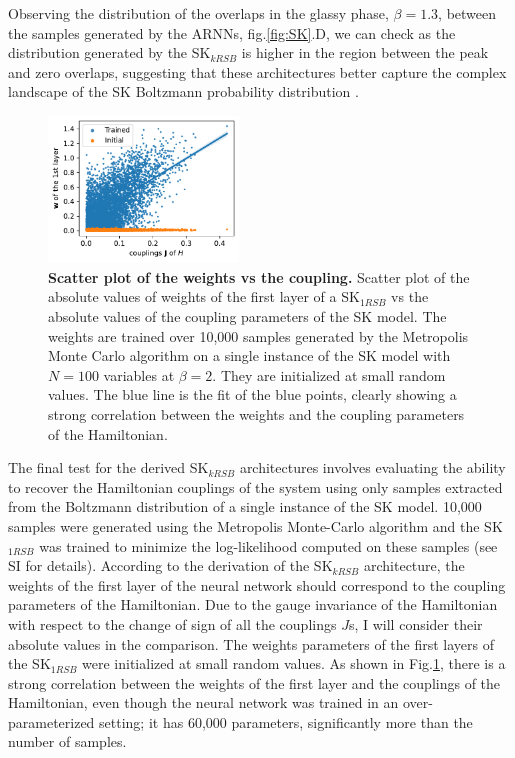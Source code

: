 \documentclass[aps,physrev,10pt,floatfix,reprint]{revtex4-2}
\begin{document}
Observing the distribution of the overlaps in the glassy phase, $\beta=1.3$, between the samples generated by the ARNNs, fig.\ref{fig:SK}.D, we can check as the distribution generated by the SK$_{kRSB}$ is higher in the region between the peak and zero overlaps, suggesting that these architectures better capture the complex landscape of the SK Boltzmann probability distribution \cite{PhysRevLett.51.1206}.

\begin{figure}[h]
    \centering 
    \includegraphics[width=0.45\textwidth]{img/MC_img.pdf}
    \caption{\textbf{Scatter plot of the weights vs the coupling.} Scatter plot of the absolute values of weights of the first layer of a SK$_{1RSB}$ vs the absolute values of the coupling parameters of the SK model. The weights are trained over 10,000 samples generated by the Metropolis Monte Carlo algorithm on a single instance of the SK model with $N=100$ variables at $\beta=2$. They are initialized at small random values. The blue line is the fit of the blue points, clearly showing a strong correlation between the weights and the coupling parameters of the Hamiltonian.}
    \label{fig:SK_MC}
\end{figure}

The final test for the derived SK$_{kRSB}$ architectures involves evaluating the ability to recover the Hamiltonian couplings of the system using only samples extracted from the Boltzmann distribution of a single instance of the SK model. 10,000 samples were generated using the Metropolis Monte-Carlo algorithm and the SK$_{1RSB}$ was trained to minimize the log-likelihood computed on these samples (see SI for details). According to the derivation of the SK$_{kRSB}$ architecture, the weights of the first layer of the neural network should correspond to the coupling parameters of the Hamiltonian. Due to the gauge invariance of the Hamiltonian with respect to the change of sign of all the couplings $J$s, I will consider their absolute values in the comparison. The weights parameters of the first layers of the SK$_{1RSB}$ were initialized at small random values. As shown in Fig.\ref{fig:SK_MC}, there is a strong correlation between the weights of the first layer and the couplings of the Hamiltonian, even though the neural network was trained in an over-parameterized setting; it has 60,000 parameters, significantly more than the number of samples.
\end{document}
